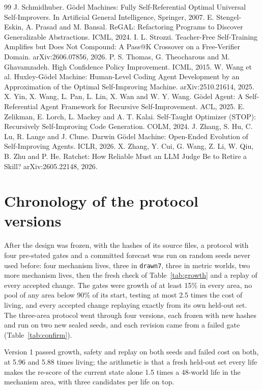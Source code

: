 \documentclass[11pt]{article}
\begin{document}
\begin{thebibliography}{99}
 J. Schmidhuber. G\"odel Machines: Fully Self-Referential Optimal Universal Self-Improvers. In Artificial General Intelligence, Springer, 2007.
 E. Stengel-Eskin, A. Prasad and M. Bansal. ReGAL: Refactoring Programs to Discover Generalizable Abstractions. ICML, 2024.
 I. L. Strozzi. Teacher-Free Self-Training Amplifies but Does Not Compound: A Pass@K Crossover on a Free-Verifier Domain. arXiv:2606.07856, 2026.
 P. S. Thomas, G. Theocharous and M. Ghavamzadeh. High Confidence Policy Improvement. ICML, 2015.
 W. Wang et al. Huxley-G\"odel Machine: Human-Level Coding Agent Development by an Approximation of the Optimal Self-Improving Machine. arXiv:2510.21614, 2025.
 X. Yin, X. Wang, L. Pan, L. Lin, X. Wan and W. Y. Wang. G\"odel Agent: A Self-Referential Agent Framework for Recursive Self-Improvement. ACL, 2025.
 E. Zelikman, E. Lorch, L. Mackey and A. T. Kalai. Self-Taught Optimizer (STOP): Recursively Self-Improving Code Generation. COLM, 2024.
 J. Zhang, S. Hu, C. Lu, R. Lange and J. Clune. Darwin G\"odel Machine: Open-Ended Evolution of Self-Improving Agents. ICLR, 2026.
 X. Zhang, Y. Cui, G. Wang, Z. Li, W. Qiu, B. Zhu and P. He. Ratchet: How Reliable Must an LLM Judge Be to Retire a Skill? arXiv:2605.22148, 2026.
\end{thebibliography}

\appendix
\section{Chronology of the protocol versions}
\label{app:chronology}

After the design was frozen, with the hashes of its source files, a protocol with four pre-stated gates and a committed forecast was run on random seeds never used before: four mechanism lives, three in \texttt{drawn7}, three in metric worlds, two more mechanism lives, then the fresh check of Table~\ref{tab:growth} and a replay of every accepted change. The gates were growth of at least 15\% in every area, no pool of any area below 90\% of its start, testing at most 2.5 times the cost of living, and every accepted change replaying exactly from its own held-out set. The three-area protocol went through four versions, each frozen with new hashes and run on two new sealed seeds, and each revision came from a failed gate (Table~\ref{tab:confirm}).

Version 1 passed growth, safety and replay on both seeds and failed cost on both, at 5.96 and 5.88 times living; the arithmetic is that a fresh held-out set every life makes the re-score of the current state alone 1.5 times a 48-world life in the mechanism area, with three candidates per life on top.
\end{document}
